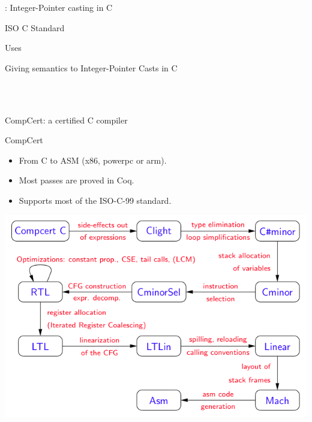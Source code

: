 \begin{frame}{\secname : Integer-Pointer casting in C}

  \vfill
  \begin{alertblock}{ISO C Standard}
  \end{alertblock}
  \vfill
  \begin{exampleblock}{Uses}
  \end{exampleblock}
  
\end{frame}

\begin{frame}{Giving semantics to Integer-Pointer Casts in C}

  \\
  \\
  
\end{frame}


\begin{frame}{CompCert: a certified C compiler}

  \begin{block}{CompCert}
    \begin{itemize}
      \item From C to ASM (x86, powerpc or arm).
      \item Most passes are proved in Coq.
      \item Supports most of the ISO-C-99 standard.
    \end{itemize}
  \end{block}
  \vfill
  \begin{center}
    \includegraphics[scale=0.6]{img/passes.png}
  \end{center}
  
\end{frame}


